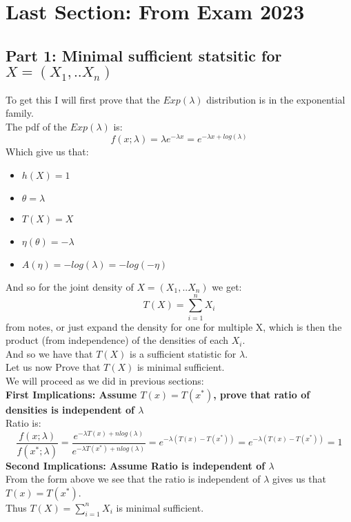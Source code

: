 \documentclass[12pt]{article}
\begin{document}
\section*{Last Section: From Exam 2023}
\subsection*{Part 1: Minimal sufficient statsitic for $X=(X_1,..X_n)$}
To get this I will first prove that the $Exp(\lambda)$ distribution is in the exponential family. \\
The pdf of the $Exp(\lambda)$ is:
\[
f(x;\lambda) = \lambda e^{-\lambda x} = e^{-\lambda x + log(\lambda)}
\]
Which give us that: 
\begin{itemize}
  \item $h(X)=1$
  \item $\theta=\lambda$
  \item $T(X)=X$
  \item $\eta(\theta) = -\lambda$
  \item $A(\eta)= -log(\lambda) = -log(-\eta)$
\end{itemize}
And so for the joint density of $X=(X_1,..X_n)$ we get:
\[
T(X) = \sum_{i=1}^{n}X_i
\]
from notes, or just expand the density for one for multiple X, which is then the product (from independence) of the densities of each $X_i$. \\
And so we have that $T(X)$ is a sufficient statistic for $\lambda$. \\
Let us now Prove that $T(X)$ is minimal sufficient. \\
We will proceed as we did in previous sections:\\
\textbf{First Implications: Assume $T(x) = T(x^*)$, prove that ratio of densities is independent of $\lambda$}\\
Ratio is: 
\[
\frac{f(x;\lambda)}{f(x^*;\lambda)} = \frac{e^{-\lambda T(x) + nlog(\lambda)}}{e^{-\lambda T(x^*) + nlog(\lambda)}} = e^{-\lambda(T(x)-T(x^*))} = e^{-\lambda(T(x)-T(x^*))} = 1
\] 
\textbf{Second Implications: Assume Ratio is independent of $\lambda$}\\
From the form above we see that the ratio is independent of $\lambda$ gives us that $T(x) = T(x^*)$. \\
Thus $T(X)= \sum_{i=1}^{n}X_i$ is minimal sufficient.
\end{document}
